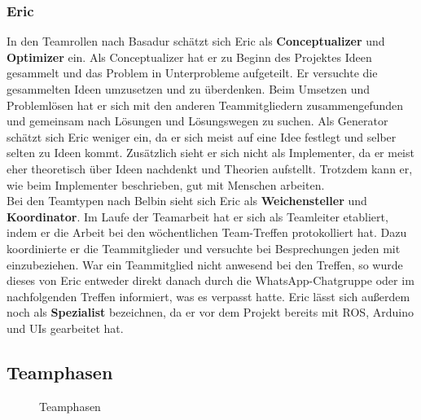 \documentclass[a4paper,12pt,headsepline]{scrartcl}
\begin{document}
		\subsubsection{Eric}
		In den Teamrollen nach Basadur schätzt sich Eric als \textbf{Conceptualizer} und \textbf{Optimizer} ein. Als Conceptualizer hat er zu Beginn des Projektes Ideen gesammelt und das Problem in Unterprobleme aufgeteilt. Er versuchte die gesammelten Ideen umzusetzen und zu überdenken. Beim Umsetzen und Problemlösen hat er sich mit den anderen Teammitgliedern zusammengefunden und gemeinsam nach Lösungen und Lösungswegen zu suchen. Als Generator schätzt sich Eric weniger ein, da er sich meist auf eine Idee festlegt und selber selten zu Ideen kommt. Zusätzlich sieht er sich nicht als Implementer, da er meist eher theoretisch über Ideen nachdenkt und Theorien aufstellt. Trotzdem kann er, wie beim Implementer beschrieben, gut mit Menschen arbeiten.\\
		Bei den Teamtypen nach Belbin sieht sich Eric als \textbf{Weichensteller} und \textbf{Koordinator}. Im Laufe der Teamarbeit hat er sich als Teamleiter etabliert, indem er die Arbeit bei den wöchentlichen Team-Treffen protokolliert hat. Dazu koordinierte er die Teammitglieder und versuchte bei Besprechungen jeden mit einzubeziehen. War ein Teammitglied nicht anwesend bei den Treffen, so wurde dieses von Eric entweder direkt danach durch die WhatsApp-Chatgruppe oder im nachfolgenden Treffen informiert, was es verpasst hatte. Eric lässt sich außerdem noch als \textbf{Spezialist} bezeichnen, da er vor dem Projekt bereits mit ROS, Arduino und UIs gearbeitet hat.\\
		

\subsection{Teamphasen}
		\begin{figure}[H]
			\centering
			\resizebox{0.5\textwidth}{!}{}
			\caption{Teamphasen}
			\label{fig:teamphasen}
		\end{figure}
		
\end{document}
